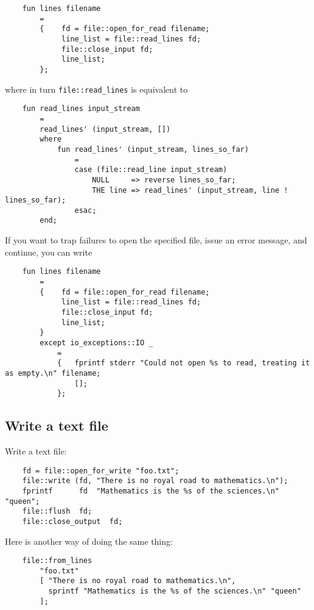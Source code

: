 \begin{verbatim}
    fun lines filename
        =
        {    fd = file::open_for_read filename;
             line_list = file::read_lines fd;
             file::close_input fd;
             line_list;
        };
\end{verbatim}

where in turn {\tt file::read\_lines} is equivalent to

\begin{verbatim}
    fun read_lines input_stream
        =
        read_lines' (input_stream, [])
        where
            fun read_lines' (input_stream, lines_so_far)
                =
                case (file::read_line input_stream)
                    NULL     => reverse lines_so_far; 
                    THE line => read_lines' (input_stream, line ! lines_so_far);
                esac;
        end;
\end{verbatim}

If you want to trap failures to open the specified file,
issue an error message, and continue, you can write

\begin{verbatim}
    fun lines filename
        =
        {    fd = file::open_for_read filename;
             line_list = file::read_lines fd;
             file::close_input fd;
             line_list;
        }
        except io_exceptions::IO _
            =
            {   fprintf stderr "Could not open %s to read, treating it as empty.\n" filename;
                [];
            };
\end{verbatim}

\cutend*

\subsection{Write a text file}

Write a text file:
\begin{verbatim}
    fd = file::open_for_write "foo.txt";
    file::write (fd, "There is no royal road to mathematics.\n");
    fprintf      fd  "Mathematics is the %s of the sciences.\n" "queen";
    file::flush  fd;
    file::close_output  fd;
\end{verbatim}

Here is another way of doing the same thing:

\begin{verbatim}
    file::from_lines
        "foo.txt"
        [ "There is no royal road to mathematics.\n",
          sprintf "Mathematics is the %s of the sciences.\n" "queen"
        ];
\end{verbatim}

